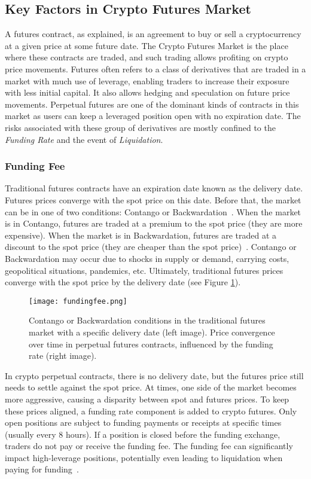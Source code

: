 \subsection{Key Factors in Crypto Futures Market}\label{appx:futures}
A futures contract, as explained, is an agreement to buy or sell a cryptocurrency at a given price at some future date. The Crypto Futures Market is the place where these contracts are traded, and such trading allows profiting on crypto price movements. Futures often refers to a class of derivatives that are traded in a market with much use of leverage, enabling traders to increase their exposure with less initial capital. It also allows hedging and speculation on future price movements. Perpetual futures are one of the dominant kinds of contracts in this market as users can keep a leveraged position open with no expiration date. The risks associated with these group of derivatives are mostly confined to the \textsl{Funding Rate} and the event of \textsl{Liquidation}.

\subsubsection{Funding Fee}\label{appx:funding}
Traditional futures contracts have an expiration date known as the delivery date. Futures prices converge with the spot price on this date. Before that, the market can be in one of two conditions: Contango or Backwardation~\cite{cme2020contango}. When the market is in Contango, futures are traded at a premium to the spot price (\ie they are more expensive). When the market is in Backwardation, futures are traded at a discount to the spot price (\ie they are cheaper than the spot price)~\cite{abd2019contango}. Contango or Backwardation may occur due to shocks in supply or demand, carrying costs, geopolitical situations, pandemics, etc. Ultimately, traditional futures prices converge with the spot price by the delivery date (see Figure \ref{fig:fundingfee}).

\begin{figure}[t]
	\centering
	\texttt{[image: fundingfee.png]}
	\caption{Contango or Backwardation conditions in the traditional futures market with a specific delivery date (left image). Price convergence over time in perpetual futures contracts, influenced by the funding rate (right image).}
	\label{fig:fundingfee}
\end{figure}

In crypto perpetual contracts, there is no delivery date, but the futures price still needs to settle against the spot price. At times, one side of the market becomes more aggressive, causing a disparity between spot and futures prices. To keep these prices aligned, a funding rate component is added to crypto futures. Only open positions are subject to funding payments or receipts at specific times (usually every 8 hours). If a position is closed before the funding exchange, traders do not pay or receive the funding fee. The funding fee can significantly impact high-leverage positions, potentially even leading to liquidation when paying for funding~\cite{Poloniex_FundingFee}.

